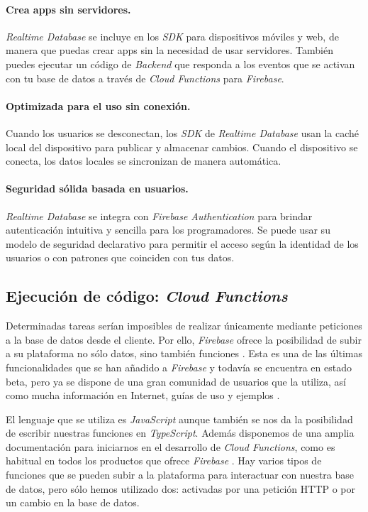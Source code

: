 \paragraph{Crea apps sin servidores.} \textit{Realtime Database} se incluye en los \textit{SDK} para dispositivos móviles y web, de manera que puedas crear apps sin la necesidad de usar servidores. También puedes ejecutar un código de \textit{Backend} que responda a los eventos que se activan con tu base de datos a través de \textit{Cloud Functions} \cite{google_firebase_nodate-3} para \textit{Firebase}.

\paragraph{Optimizada para el uso sin conexión.} Cuando los usuarios se desconectan, los \textit{SDK} de \textit{Realtime Database} usan la caché local del dispositivo para publicar y almacenar cambios. Cuando el dispositivo se conecta, los datos locales se sincronizan de manera automática.

\paragraph{Seguridad sólida basada en usuarios.} \textit{Realtime Database} se integra con \textit{Firebase Authentication} para brindar autenticación intuitiva y sencilla para los programadores. Se puede usar su modelo de seguridad declarativo para permitir el acceso según la identidad de los usuarios o con patrones que coinciden con tus datos.

\subsection{Ejecución de código: \textit{Cloud Functions}\label{sec:cloud_functions}}
Determinadas tareas serían imposibles de realizar únicamente mediante peticiones a la base de datos desde el cliente. Por ello, \textit{Firebase} ofrece la posibilidad de subir a su plataforma no sólo datos, sino también funciones \cite{noauthor_cloud_nodate}. Esta es una de las últimas funcionalidades que se han añadido a \textit{Firebase} y todavía se encuentra en estado beta, pero ya se dispone de una gran comunidad de usuarios que la utiliza, así como mucha información en Internet, guías de uso y ejemplos \cite{noauthor_cloud_nodate-1}.

El lenguaje que se utiliza es \textit{JavaScript} aunque también se nos da la posibilidad de escribir nuestras funciones en \textit{TypeScript}. Además disponemos de una amplia documentación para iniciarnos en el desarrollo de \textit{Cloud Functions}, como es habitual en todos los productos que ofrece \textit{Firebase} \cite{noauthor_documentacion_nodate}. Hay varios tipos de funciones que se pueden subir a la plataforma para interactuar con nuestra base de datos, pero sólo hemos utilizado dos: activadas por una petición HTTP o por un cambio en la base de datos.


